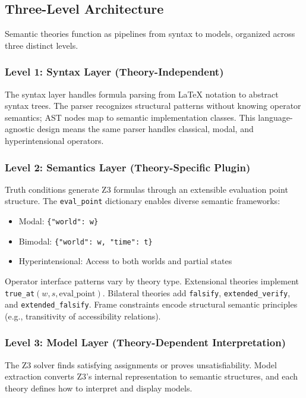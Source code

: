 \documentclass[pdflatex,sn-mathphys-num]{sn-jnl}
\newcommand{\zfalsify}{\texttt{falsify}}
\newcommand{\ztrueat}{\texttt{true\_at}}
\newcommand{\zextverify}{\texttt{extended\_verify}}
\newcommand{\zextfalsify}{\texttt{extended\_falsify}}
\theoremstyle{thmstyleone}
\theoremstyle{thmstyletwo}
\theoremstyle{thmstylethree}
\begin{document}
\subsection{Three-Level Architecture}\label{sec:architecture}

Semantic theories function as pipelines from syntax to models, organized across three distinct levels.

\subsubsection{Level 1: Syntax Layer (Theory-Independent)}

The syntax layer handles formula parsing from \LaTeX{} notation to abstract syntax trees.
The parser recognizes structural patterns without knowing operator semantics; AST nodes map to semantic implementation classes.
This language-agnostic design means the same parser handles classical, modal, and hyperintensional operators.

\subsubsection{Level 2: Semantics Layer (Theory-Specific Plugin)}

Truth conditions generate Z3 formulas through an extensible evaluation point structure.
The \texttt{eval\_point} dictionary enables diverse semantic frameworks:
\begin{itemize}
    \item Modal: \texttt{\{"world": w\}}
    \item Bimodal: \texttt{\{"world": w, "time": t\}}
    \item Hyperintensional: Access to both worlds and partial states
\end{itemize}

Operator interface patterns vary by theory type.
Extensional theories implement \ztrueat{}$(w, s, \text{eval\_point})$.
Bilateral theories add \zfalsify{}, \zextverify{}, and \zextfalsify{}.
Frame constraints encode structural semantic principles (e.g., transitivity of accessibility relations).

\subsubsection{Level 3: Model Layer (Theory-Dependent Interpretation)}

The Z3 solver finds satisfying assignments or proves unsatisfiability.
Model extraction converts Z3's internal representation to semantic structures, and each theory defines how to interpret and display models.
\end{document}
